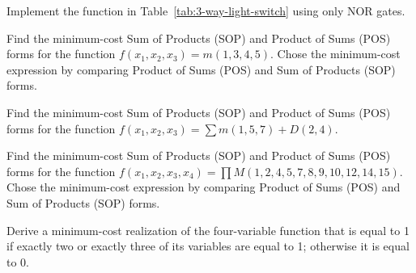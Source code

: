 \begin{prob}[10 marks]
 Implement the function in Table~\ref{tab:3-way-light-switch} using only NOR
 gates. 
\end{prob}


\begin{prob}[10 marks]
Find the minimum-cost Sum of Products (SOP) and Product of Sums (POS) forms for the function $f(x_1 , x_2 , x_3 ) =
m(1, 3, 4, 5)$.  Chose the minimum-cost expression by comparing Product of Sums (POS) and Sum of Products (SOP) forms. 
\label{prob:237}
\end{prob}

\begin{prob}[10 marks]
Find the minimum-cost Sum of Products (SOP) and Product of Sums (POS) forms for the function $f(x_1 , x_2 , x_3) =
\sum m(1, 5, 7) + D(2, 4)$.  
\end{prob}

\begin{prob}[10 marks]
Find the minimum-cost Sum of Products (SOP) and Product of Sums (POS) forms for the function $f(x_1 , x_2 , x_3,
x_4) = \prod M(1, 2, 4, 5, 7, 8, 9, 10, 12, 14, 15).$  Chose the minimum-cost
expression by comparing Product of Sums (POS) and Sum of Products (SOP) forms. 
\end{prob}


\begin{prob}[10 marks]
Derive a minimum-cost realization of the four-variable function that is equal to 1 if exactly
two or exactly three of its variables are equal to 1; otherwise it is equal to
0.  
\end{prob}

